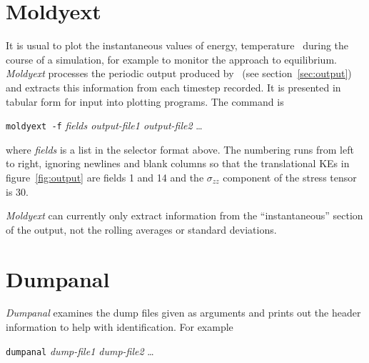 \section{Moldyext}%
It is usual to plot the instantaneous values of energy, temperature
\etc\ during the course of a simulation, for example to monitor the
approach to equilibrium.  {\em Moldyext\/} processes the periodic
output produced by \moldy\ (see section~\ref{sec:output}) and extracts
this information from each timestep recorded.  It is presented in
tabular form for input into plotting programs.  The command is
\begin{center}
\verb'moldyext -f' {\em fields output-file1 output-file2} \ldots
\end{center}
where {\em fields\/} is a list in the selector format above.  The
numbering runs from left to right, ignoring newlines and blank columns
so that the translational KEs in figure~\ref{fig:output} are fields 1
and 14 and the $\sigma_{zz}$ component of the stress tensor is 30.

{\em Moldyext\/} can currently only extract information from the
``instantaneous'' section of the output, not the rolling averages or
standard deviations.

\section{Dumpanal}%
{\em Dumpanal\/} examines the dump files given as arguments and
prints out the header information to help with identification. For
example
\begin{center}
\verb'dumpanal' {\em dump-file1 dump-file2} \ldots
\end{center}

